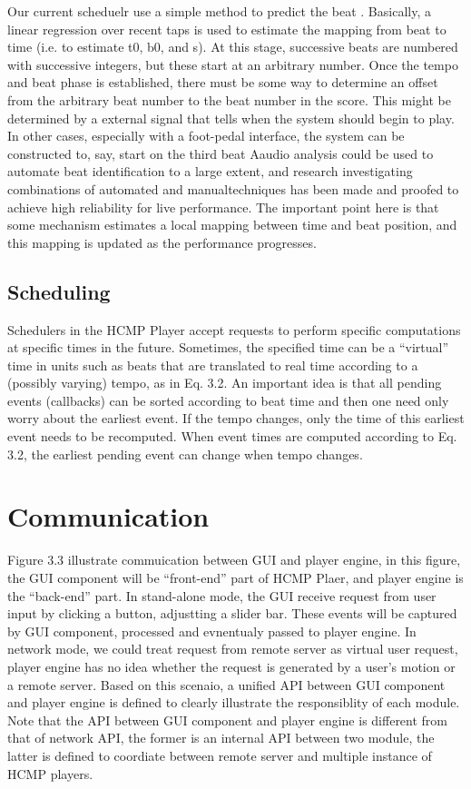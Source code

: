Our current scheduelr use a simple method to predict the beat . 
Basically, a linear regression over recent taps is used to estimate the
mapping from beat to time (i.e. to estimate t0, b0, and s). At this stage, successive
beats are numbered with successive integers, but these start at an arbitrary number.
Once the tempo and beat phase is established, there must be some way to determine
an offset from the arbitrary beat number to the beat number in the score. This might
be determined by a external signal that tells when the system should begin 
to play. In other cases, especially with a foot-pedal interface, 
the system can be constructed to, say,
start on the third beat
Aaudio analysis could be used to automate beat identification
to a large extent, and research investigating combinations of automated 
and manualtechniques has been made and proofed to achieve high reliability 
for live performance. The
important point here is that some mechanism estimates a local mapping between
time and beat position, and this mapping is updated as the performance progresses.

\subsection{Scheduling}

Schedulers in the HCMP Player accept requests to perform specific
computations at specific times in the future. Sometimes, the specified time 
can be a ``virtual'' time in units such as beats that are translated to real 
time according to a
(possibly varying) tempo, as in Eq. 3.2. An important idea is
that all pending events (callbacks) can be sorted according to beat time 
and then one need only worry about the earliest event. If the tempo 
changes, only the time of this
earliest event needs to be recomputed. When event times are
computed according to Eq. 3.2, the earliest pending event can change when tempo
changes. 

\section{Communication}

Figure 3.3 illustrate commuication between GUI and player engine, in this figure,  
the GUI component will be ``front-end'' part of HCMP Plaer, and player engine   
is the ``back-end'' part. In stand-alone mode, the GUI receive request from  
user input by clicking a button, adjustting a slider bar. These events will be  
captured by GUI component, processed and evnentualy passed to player engine. 
In network mode, we could 
treat request from remote server as virtual user request, player engine has no 
idea whether the request is generated by a user's motion or a remote server. Based
on this scenaio, a unified API between GUI component and player engine is defined to
clearly illustrate the responsiblity of each module. Note that the API between 
GUI component and player engine is different from that of network API, the 
former is an internal API between two module, the latter is defined to coordiate
between remote server and multiple instance of HCMP players.

